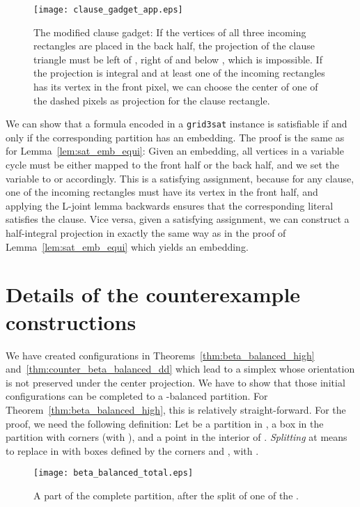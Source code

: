 \documentclass[12pt]{article}
\begin{document}
\begin{appendix}
\begin{figure}
\begin{center}
\texttt{[image: clause\_gadget\_app.eps]}
\end{center}
\caption{The modified clause gadget: If the vertices of all three incoming rectangles are placed in
the back half, the projection of the clause triangle must be left of , right of 
and below , which is impossible. If the projection is integral and at least one of the
incoming rectangles has its vertex in the front pixel, we can choose the center of one of the dashed
pixels as projection for the clause rectangle.}
\label{fig:clause-gadget-mod}
\end{figure}
We can show that a formula encoded in a \texttt{grid3sat} instance is satisfiable
if and only if the corresponding partition has an embedding.
The proof is the same as for Lemma~\ref{lem:sat_emb_equi}: Given an embedding,
all vertices in a variable cycle must be either mapped to the front half or
the back half, and we set the variable to  or  accordingly. 
This is a satisfying assignment, because for any clause, one of the incoming 
rectangles must have its vertex in the front half, and applying the L-joint lemma
backwards ensures that the corresponding literal satisfies the clause.
Vice versa, given a satisfying assignment, we can construct a half-integral
projection in exactly the same way as in the proof of Lemma~\ref{lem:sat_emb_equi}
which yields an embedding.

\section{Details of the counterexample constructions}
\label{app:puzzle}

We have created configurations in Theorems~\ref{thm:beta_balanced_high}
and~\ref{thm:counter_beta_balanced_dd} which lead to a simplex whose orientation
is not preserved under the center projection. We have to show that those 
initial configurations can be completed to a -balanced partition.
For Theorem~\ref{thm:beta_balanced_high}, this is relatively straight-forward.
For the proof, we need the following definition: 
Let  be a partition in ,  a box in the partition with corners 
(with ), 
and  a point in the interior of .
\emph{Splitting}  at  means to replace  in  with  boxes defined by the corners
 and , with .

\begin{figure}[hb]
\centering
\texttt{[image: beta\_balanced\_total.eps]}
\caption{A part of the complete partition, after the split of one of the .}
\label{fig:completion}
\end{figure}


\end{appendix}
\end{document}
